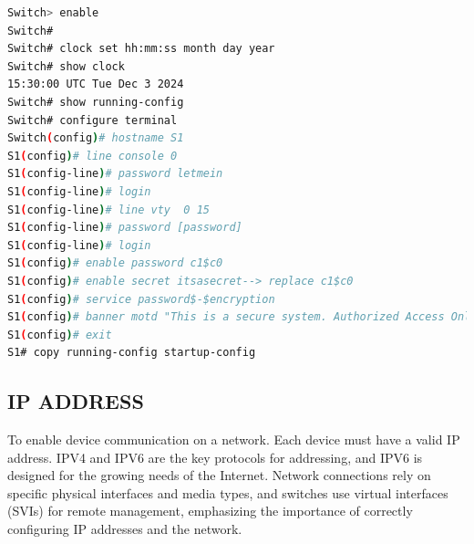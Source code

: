 \documentclass[a4paper,11pt]{article}
\begin{document}
\begin{lstlisting}[language=bash, caption=Switch Configuration]
Switch> enable
Switch#
Switch# clock set hh:mm:ss month day year
Switch# show clock
15:30:00 UTC Tue Dec 3 2024
Switch# show running-config
Switch# configure terminal
Switch(config)# hostname S1
S1(config)# line console 0
S1(config-line)# password letmein
S1(config-line)# login
S1(config-line)# line vty  0 15
S1(config-line)# password [password]
S1(config-line)# login
S1(config)# enable password c1$c0
S1(config)# enable secret itsasecret--> replace c1$c0
S1(config)# service password$-$encryption
S1(config)# banner motd "This is a secure system. Authorized Access Only!"
S1(config)# exit
S1# copy running-config startup-config
\end{lstlisting}

\subsection{IP ADDRESS}
To enable device communication on a network. Each device must have a valid IP address. IPV4 and IPV6 are the key protocols for addressing, and IPV6 is designed for the growing needs of the Internet. Network connections rely on specific physical interfaces and media types, and switches use virtual interfaces (SVIs) for remote management, emphasizing the importance of correctly configuring IP addresses and the network.\\
\end{document}
